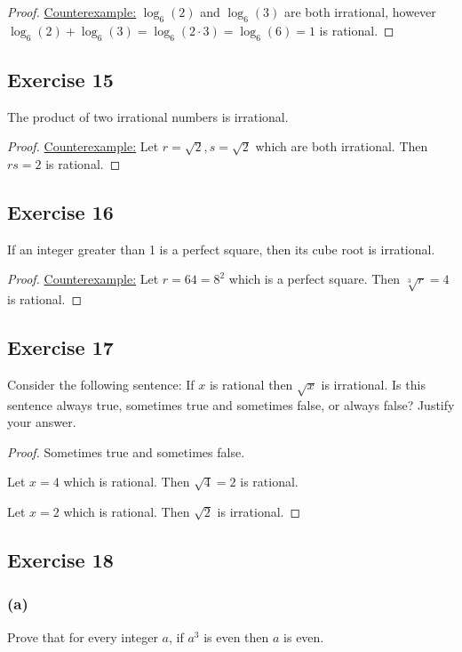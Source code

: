 \documentclass[14pt]{extarticle}
\begin{document}
\begin{proof}
\underline{Counterexample:} $\log_6(2)$ and $\log_6(3)$ are both irrational, however \\ $\log_6(2) + \log_6(3) = \log_6(2\cdot 3) = \log_6(6) = 1$ is rational.
\end{proof}

\subsection{Exercise 15}
The product of two irrational numbers is irrational.

\begin{proof}
\underline{Counterexample:} Let $r = \sqrt{2}, s = \sqrt{2}$ which are both irrational. Then $rs = 2$ is rational.
\end{proof}

\subsection{Exercise 16}
If an integer greater than 1 is a perfect square, then its cube root is irrational.

\begin{proof}
\underline{Counterexample:} Let $r = 64 = 8^2$ which is a perfect square. Then $\sqrt[3]{r} = 4$ is rational.
\end{proof}

\subsection{Exercise 17}
Consider the following sentence: If $x$ is rational then $\sqrt{x}$ is irrational. Is this sentence always true, sometimes true and sometimes false, or always false? Justify your answer.

\begin{proof}
Sometimes true and sometimes false.

Let $x = 4$ which is rational. Then $\sqrt{4} = 2$ is rational.

Let $x = 2$ which is rational. Then $\sqrt{2}$ is irrational.
\end{proof}

\subsection{Exercise 18}
\subsubsection{(a)}
Prove that for every integer $a$, if $a^3$ is even then $a$ is even.
\end{document}
